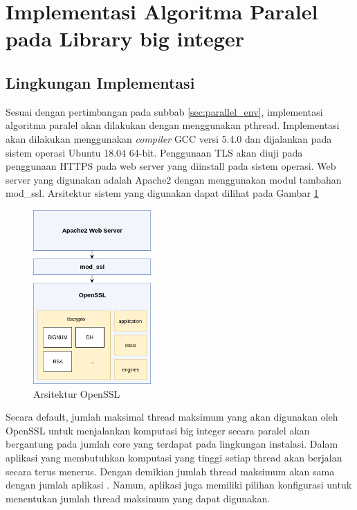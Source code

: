 
\section{Implementasi Algoritma Paralel pada Library big integer}
\subsection{Lingkungan Implementasi}
Sesuai dengan pertimbangan pada subbab \ref{sec:parallel_env}, implementasi algoritma paralel akan dilakukan dengan menggunakan pthread. Implementasi akan dilakukan menggunakan \textit{compiler} GCC versi 5.4.0 dan dijalankan pada sistem operasi Ubuntu 18.04 64-bit. Penggunaan TLS akan diuji pada penggunaan HTTPS pada web server yang diinstall pada sistem operasi. Web server yang digunakan adalah Apache2 dengan menggunakan modul tambahan mod\_ssl. Arsitektur sistem yang digunakan dapat dilihat pada Gambar \ref{fig:openssl_arch}

\begin{figure}[h]
  \centering
  \includegraphics[width=0.4\textwidth]{resources/ch-4/implementation_arch.png}
  \caption{Arsitektur OpenSSL}
  \label{fig:openssl_arch}
\end{figure}

Secara default, jumlah maksimal thread maksimum yang akan digunakan oleh OpenSSL untuk menjalankan komputasi big integer secara paralel akan bergantung pada jumlah core yang terdapat pada lingkungan instalasi. Dalam aplikasi yang membutuhkan komputasi yang tinggi setiap thread akan berjalan secara terus menerus. Dengan demikian jumlah thread maksimum akan sama dengan jumlah aplikasi . Namun, aplikasi juga memiliki pilihan konfigurasi untuk menentukan jumlah thread maksimum yang dapat digunakan.

